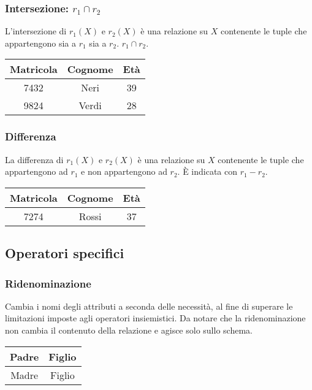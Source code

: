 \documentclass{article}
\begin{document}
\subsubsection*{Intersezione: $r_1 \cap r_2$}
L'intersezione di $r_1(X)$ e $r_2(X)$ è una relazione su $X$ contenente le tuple che appartengono sia a $r_1$ sia a $r_2$. $r_1 \cap r_2$.

\begin{table}[htbp]
\centering
\begin{tabular}{|c|c|c|}
\hline
Matricola & Cognome & Età \\ \hline
7432      & Neri    & 39  \\ \hline
9824      & Verdi   & 28  \\ \hline
\end{tabular}
\end{table}

\subsubsection*{Differenza}
La differenza di $r_1(X)$ e $r_2(X)$ è una relazione su $X$ contenente le tuple che appartengono ad $r_1$ e non appartengono ad $r_2$. È indicata con $r_1 - r_2$.

\begin{table}[htbp]
\centering
\begin{tabular}{|c|c|c|}
\hline
Matricola & Cognome & Età \\ \hline
7274      & Rossi   & 37  \\ \hline
\end{tabular}
\end{table}

\subsection*{Operatori specifici}

\subsubsection*{Ridenominazione}
Cambia i nomi degli attributi a seconda delle necessità, al fine di superare le limitazioni imposte agli operatori insiemistici. Da notare che la ridenominazione non cambia il contenuto della relazione e agisce solo sullo schema.

\begin{table}[htbp]
\centering
\begin{tabular}{|c|c|}
\hline
Padre & Figlio \\ \hline
Madre & Figlio \\ \hline
\end{tabular}
\end{table}
\end{document}

